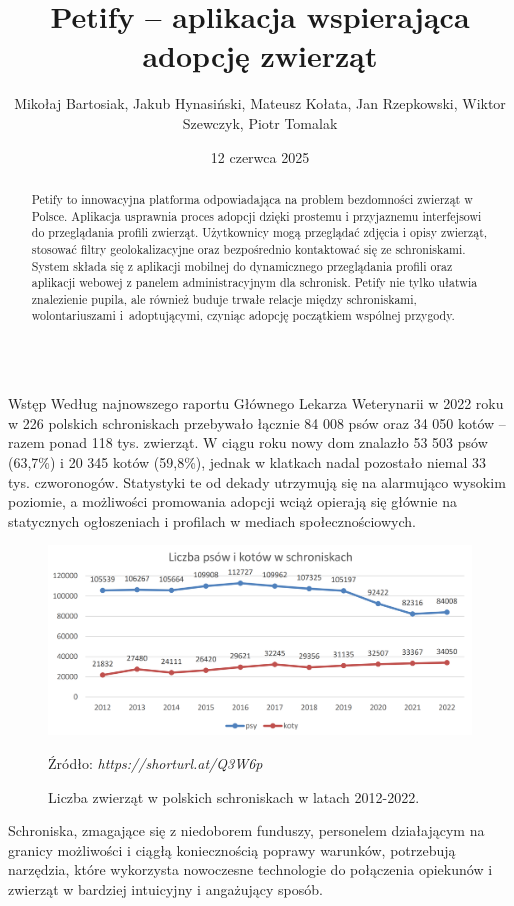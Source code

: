 \documentclass[final]{beamer} %
\title[\hspace{1cm} Petify – aplikacja wspierająca adopcję zwierząt]{Petify – aplikacja wspierająca adopcję zwierząt}
\author[\hspace{1cm} Mikołaj Bartosiak, Jakub Hynasiński, Mateusz Kołata, Jan Rzepkowski, Wiktor Szewczyk, Piotr Tomalak]{Mikołaj Bartosiak, Jakub Hynasiński, Mateusz Kołata, Jan Rzepkowski, Wiktor Szewczyk, Piotr Tomalak}
\institute[Instytut Informatyki, Politechnika Łódzka, al. Politechniki 8, 93-590 Łódź \hspace{1cm}]{Instytut Informatyki, Politechnika Łódzka}
\date{12 czerwca 2025}
\begin{document}
\renewcommand{\abstractname}{Streszczenie}
\renewcommand{\figurename}{Rysunek}
\renewcommand{\tablename}{Tabela}
\captionsetup[figure]{labelformat=simple, labelsep=colon, font=small}
\renewcommand\thesubfigure{Rysunek \arabic{subfigure}}
\begin{frame}{}
\maketitle
\begin{abstract}
\centering
Petify to innowacyjna platforma odpowiadająca na problem bezdomności zwierząt w Polsce. Aplikacja usprawnia proces adopcji dzięki prostemu i przyjaznemu interfejsowi do przeglądania profili zwierząt. Użytkownicy mogą przeglądać zdjęcia i opisy zwierząt, stosować filtry geolokalizacyjne oraz bezpośrednio kontaktować się ze schroniskami.
System składa się z aplikacji mobilnej do dynamicznego przeglądania profili oraz aplikacji webowej z panelem administracyjnym dla schronisk.
Petify nie tylko ułatwia znalezienie pupila, ale również buduje trwałe relacje między schroniskami, wolontariuszami i~adoptującymi, czyniąc adopcję początkiem wspólnej przygody.
\end{abstract}

\begin{columns}[T]
\begin{column}[T]{0.48\textwidth}
\begin{block}{Wstęp}
\justifying
Według najnowszego raportu Głównego Lekarza Weterynarii w 2022 roku w 226 polskich schroniskach przebywało łącznie 84 008 psów oraz 34 050 kotów – razem ponad 118 tys. zwierząt.
W ciągu roku nowy dom znalazło 53 503 psów (63,7\%) i 20 345 kotów (59,8\%), jednak w klatkach nadal pozostało niemal 33 tys. czworonogów.
Statystyki te od dekady utrzymują się na alarmująco wysokim poziomie, a możliwości promowania adopcji wciąż opierają się głównie na statycznych ogłoszeniach i profilach w mediach społecznościowych.

\begin{figure}[h]
\centering
\includegraphics[width=1.0\textwidth]{chart.png}
\caption{Liczba zwierząt w polskich schroniskach w latach 2012-2022.}
{\centering\small Źródło: \itshape{https://shorturl.at/Q3W6p}\par}
\label{fig:chart}
\end{figure}
Schroniska, zmagające się z niedoborem funduszy, personelem działającym na granicy możliwości i ciągłą koniecznością poprawy warunków, potrzebują narzędzia, które wykorzysta nowoczesne technologie do połączenia opiekunów i zwierząt w bardziej intuicyjny i angażujący sposób.


\end{block}
\end{column}
\end{columns}
\end{frame}
\end{document}
